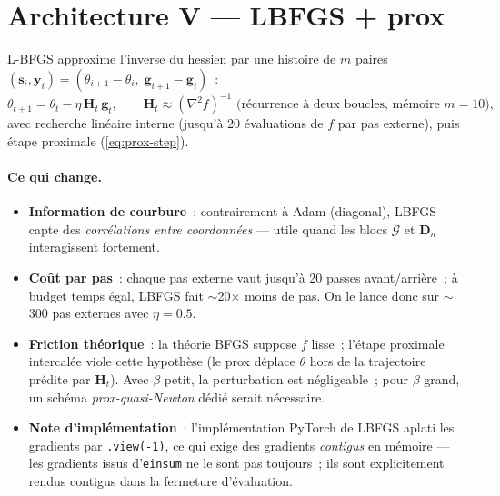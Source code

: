 \documentclass[11pt,a4paper]{article}
\newcommand{\T}[1]{\bm{\mathcal{#1}}}          %
\newcommand{\M}[1]{\bm{#1}}                     %
\begin{document}
\section{Architecture V --- LBFGS + prox}
\label{sec:lbfgs}

L-BFGS approxime l'inverse du hessien par une histoire de $m$ paires
$(\M{s}_i,\M{y}_i)=(\theta_{i+1}-\theta_i,\;\M{g}_{i+1}-\M{g}_i)$~:
\begin{equation}
  \theta_{t+1} = \theta_t - \eta\,\M{H}_t\,\M{g}_t,
  \qquad
  \M{H}_t \approx (\nabla^2 f)^{-1}
  \text{ (récurrence à deux boucles, mémoire } m=10\text{)},
  \label{eq:lbfgs}
\end{equation}
avec recherche linéaire interne (jusqu'à 20 évaluations de $f$ par pas
externe), puis étape proximale (\ref{eq:prox-step}).

\paragraph{Ce qui change.}
\begin{itemize}
  \item \textbf{Information de courbure}~: contrairement à Adam (diagonal),
  LBFGS capte des \emph{corrélations entre coordonnées} — utile quand les
  blocs $\T{G}$ et $\M{D}_n$ interagissent fortement.
  \item \textbf{Coût par pas}~: chaque pas externe vaut jusqu'à 20 passes
  avant/arrière~; à budget temps égal, LBFGS fait $\sim$20$\times$ moins de
  pas. On le lance donc sur $\sim$300 pas externes avec $\eta=0.5$.
  \item \textbf{Friction théorique}~: la théorie BFGS suppose $f$ lisse~;
  l'étape proximale intercalée viole cette hypothèse (le prox déplace
  $\theta$ hors de la trajectoire prédite par $\M{H}_t$). Avec $\beta$ petit,
  la perturbation est négligeable~; pour $\beta$ grand, un schéma
  \emph{prox-quasi-Newton} dédié serait nécessaire.
  \item \textbf{Note d'implémentation}~: l'implémentation PyTorch de LBFGS
  aplati les gradients par \texttt{.view(-1)}, ce qui exige des gradients
  \emph{contigus} en mémoire — les gradients issus d'\texttt{einsum} ne le
  sont pas toujours~; ils sont explicitement rendus contigus dans la
  fermeture d'évaluation.
\end{itemize}

\end{document}
